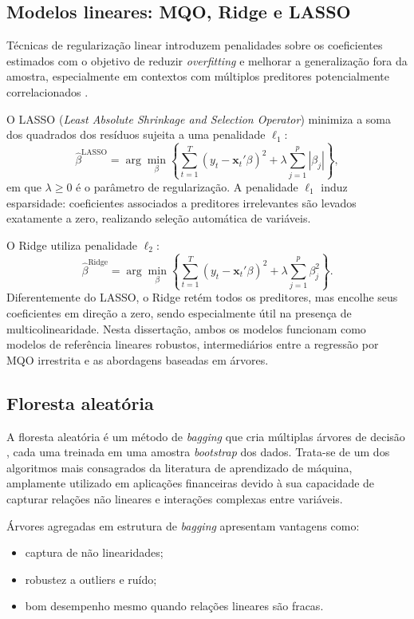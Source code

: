 \subsection{Modelos lineares: MQO, Ridge e LASSO}

Técnicas de regularização linear introduzem penalidades sobre os coeficientes
estimados com o objetivo de reduzir \textit{overfitting} e melhorar a
generalização fora da amostra, especialmente em contextos com múltiplos
preditores potencialmente correlacionados \citep{tibshirani1996lasso}.

O LASSO (\textit{Least Absolute Shrinkage and Selection Operator}) minimiza a
soma dos quadrados dos resíduos sujeita a uma penalidade $\ell_1$:
\[
\hat{\beta}^{\text{LASSO}} = \arg\min_{\beta}
    \left\{ \sum_{t=1}^{T}(y_t - \mathbf{x}_t'\beta)^2
            + \lambda \sum_{j=1}^{p} |\beta_j| \right\},
\]
em que $\lambda \geq 0$ é o parâmetro de regularização. A penalidade $\ell_1$
induz esparsidade: coeficientes associados a preditores irrelevantes são levados
exatamente a zero, realizando seleção automática de variáveis.

O Ridge utiliza penalidade $\ell_2$:
\[
\hat{\beta}^{\text{Ridge}} = \arg\min_{\beta}
    \left\{ \sum_{t=1}^{T}(y_t - \mathbf{x}_t'\beta)^2
            + \lambda \sum_{j=1}^{p} \beta_j^2 \right\}.
\]
Diferentemente do LASSO, o Ridge retém todos os preditores, mas encolhe seus
coeficientes em direção a zero, sendo especialmente útil na presença de
multicolinearidade. Nesta dissertação, ambos os modelos funcionam como
modelos de referência lineares robustos, intermediários entre a regressão por MQO
irrestrita e as abordagens baseadas em árvores.

\subsection{Floresta aleatória}

A floresta aleatória é um método de \textit{bagging} que cria múltiplas árvores de
decisão \citep{breiman2001randomforest}, cada uma treinada em uma amostra
\textit{bootstrap} dos dados. Trata-se de um dos algoritmos mais consagrados da
literatura de aprendizado de máquina, amplamente utilizado em aplicações
financeiras devido à sua capacidade de capturar relações não lineares e
interações complexas entre variáveis.

Árvores agregadas em estrutura de \textit{bagging} apresentam vantagens como:

\begin{itemize}
    \item captura de não linearidades;
    \item robustez a outliers e ruído;
    \item bom desempenho mesmo quando relações lineares são fracas.
\end{itemize}

